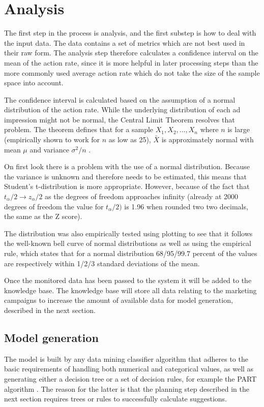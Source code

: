 \documentclass[11pt,a4paper]{report}
\begin{document}
\section{Analysis}
The first step in the process is analysis, and the first substep is how to deal with the input data. The data contains a set of metrics which are not best used in their raw form. The analysis step therefore calculates a confidence interval on the mean of the action rate, since it is more helpful in later processing steps than the more commonly used average action rate which do not take the size of the sample space into account.

The confidence interval is calculated based on the assumption of a normal distribution of the action rate. While the underlying distribution of each ad impression might not be normal, the Central Limit Theorem resolves that problem. The theorem defines that for a sample \(X_1, X_2, ..., X_n\) where \(n\) is large (empirically shown to work for \(n\) as low as 25), \(\bar{X}\) is approximately normal with mean \(\mu\) and variance \(\sigma^2/n\) \citep{Milton2002}.

On first look there is a problem with the use of a normal distribution. Because the variance is unknown and therefore needs to be estimated, this means that Student's t-distribution is more appropriate. However, because of the fact that \(t_\alpha/2 \to z_\alpha/2\) as the degrees of freedom approaches infinity (already at 2000 degrees of freedom the value for \(t_\alpha/2)\) is 1.96 when rounded two two decimals, the same as the Z score).

The distribution was also empirically tested using plotting to see that it follows the well-known bell curve of normal distributions as well as using the empirical rule, which states that for a normal distribution 68/95/99.7 percent of the values are respectively within 1/2/3 standard deviations of the mean.

Once the monitored data has been passed to the system it will be added to the knowledge base. The knowledge base will store all data relating to the marketing campaigns to increase the amount of available data for model generation, described in the next section.

\subsection{Model generation}
The model is built by any data mining classifier algorithm that adheres to the basic requirements of handling both numerical and categorical values, as well as generating either a decision tree or a set of decision rules, for example the PART algorithm \citep{Frank1998}. The reason for the latter is that the planning step described in the next section requires trees or rules to successfully calculate suggestions.
\end{document}
